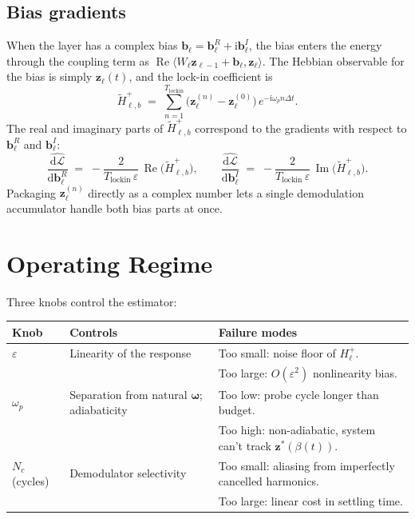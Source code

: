 \documentclass[11pt]{article}
\newcommand{\im}{\mathrm{i}}
\newcommand{\dd}{\mathrm{d}}
\newcommand{\dt}{\Delta t}
\theoremstyle{definition}
\DeclareMathOperator{\Real}{Re}
\DeclareMathOperator{\Imag}{Im}
\begin{document}
\subsection{Bias gradients}
When the layer has a complex bias $\bm{b}_\ell = \bm{b}_\ell^R + \im\bm{b}_\ell^I$,
the bias enters the energy through the coupling term as
$\Real\langle W_\ell\bm{z}_{\ell-1} + \bm{b}_\ell, \bm{z}_\ell\rangle$.
The Hebbian observable for the bias is simply $\bm{z}_\ell(t)$, and the
lock-in coefficient is
\begin{equation}\label{eq:bias-acc}
  \tilde H_{\ell,b}^{+}
  \;=\;
  \sum_{n=1}^{T_\text{lockin}}
    \bigl(\bm{z}_\ell^{(n)} - \bm{z}_\ell^{(0)}\bigr)\,
    e^{-\im\omega_p n\dt}.
\end{equation}
The real and imaginary parts of $\tilde H_{\ell,b}^{+}$ correspond
to the gradients with respect to $\bm{b}_\ell^R$ and $\bm{b}_\ell^I$:
\begin{equation}\label{eq:bias-grad}
  \widehat{\frac{\dd\mathcal{L}}{\dd \bm{b}_\ell^R}}
  \;=\;
  -\frac{2}{T_\text{lockin}\,\varepsilon}\,\Real\bigl(\tilde H_{\ell,b}^{+}\bigr),
  \qquad
  \widehat{\frac{\dd\mathcal{L}}{\dd \bm{b}_\ell^I}}
  \;=\;
  -\frac{2}{T_\text{lockin}\,\varepsilon}\,\Imag\bigl(\tilde H_{\ell,b}^{+}\bigr).
\end{equation}
Packaging $\bm{z}_\ell^{(n)}$ directly as a complex number lets a
single demodulation accumulator handle both bias parts at once.

\section{Operating Regime}\label{sec:knobs}

Three knobs control the estimator:

\begin{center}
\small
\begin{tabular}{lll}
\toprule
\textbf{Knob} & \textbf{Controls} & \textbf{Failure modes} \\
\midrule
$\varepsilon$ & Linearity of the response &
  Too small: noise floor of $H_\ell^{+}$. \\
  & & Too large: $O(\varepsilon^2)$ nonlinearity bias. \\
$\omega_p$ & Separation from natural $\bm{\omega}$; adiabaticity &
  Too low: probe cycle longer than budget. \\
  & & Too high: non-adiabatic, system can't track $\bm{z}^*(\beta(t))$. \\
$N_c$ (cycles) & Demodulator selectivity &
  Too small: aliasing from imperfectly cancelled harmonics. \\
  & & Too large: linear cost in settling time. \\
\bottomrule
\end{tabular}
\end{center}
\end{document}
